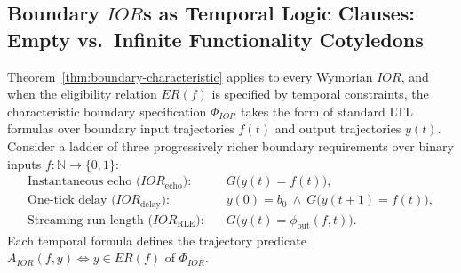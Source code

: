 \subsection{Boundary \texorpdfstring{$IOR$s}{IORs} as Temporal Logic Clauses: Empty vs.\ Infinite Functionality Cotyledons}
\label{sec:case-basics}

Theorem~\ref{thm:boundary-characteristic} applies to every Wymorian $IOR$, and when the eligibility relation $ER(f)$ is specified by temporal constraints, the characteristic boundary specification $\Phi_{IOR}$ takes the form of standard LTL formulas over boundary input trajectories $f(t)$ and output trajectories $y(t)$. Consider a ladder of three progressively richer boundary requirements over binary inputs $f:\mathbb{N}\to\{0,1\}$:
\begin{align}
 \text{Instantaneous echo ($IOR_{\mathrm{echo}}$):}\quad
   &G\bigl(y(t)=f(t)\bigr), \label{eq:echo-phi}\\
 \text{One-tick delay ($IOR_{\mathrm{delay}}$):}\quad
   &y(0)=b_0\ \wedge\
     G\bigl(y(t{+}1)=f(t)\bigr), \label{eq:delay-phi}\\
 \text{Streaming run-length ($IOR_{\mathrm{RLE}}$):}\quad
   &G\bigl(y(t)=\phi_{\mathrm{out}}(f,t)\bigr). \label{eq:rle-phi}
\end{align}
Each temporal formula defines the trajectory predicate $A_{IOR}(f,y)\Leftrightarrow y\in ER(f)$ of $\Phi_{IOR}$.

